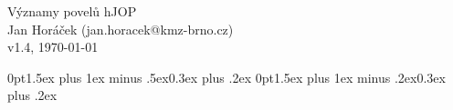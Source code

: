 \documentclass[12pt,a4paper,landscape]{article}
\begin{document}
\pagestyle{empty}

\begin{center}
\huge Významy povelů hJOP\\
\normalsize Jan Horáček (jan.horacek@kmz-brno.cz)\\
v1.4, \today
\end{center}

\vspace{-4ex}

\titlespacing*{\section} {0pt}{1.5ex plus 1ex minus .5ex}{0.3ex plus .2ex}
\titlespacing*{\subsection} {0pt}{1.5ex plus 1ex minus .2ex}{0.3ex plus .2ex}

\end{document}
